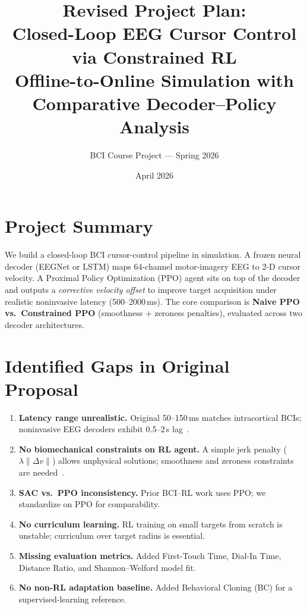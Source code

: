 \documentclass[11pt]{article}
\title{Revised Project Plan:\\Closed-Loop EEG Cursor Control via Constrained RL\\[0.3em]
\large Offline-to-Online Simulation with Comparative Decoder--Policy Analysis}
\author{BCI Course Project --- Spring 2026}
\date{April 2026}
\begin{document}
\maketitle

\section{Project Summary}
We build a closed-loop BCI cursor-control pipeline in simulation.
A frozen neural decoder (EEGNet or LSTM) maps 64-channel motor-imagery EEG to 2-D cursor velocity.
A Proximal Policy Optimization (PPO) agent sits on top of the decoder and outputs a \emph{corrective velocity offset} to improve target acquisition under realistic noninvasive latency (500--2000\,ms).
The core comparison is \textbf{Naive PPO vs.\ Constrained PPO} (smoothness + zeroness penalties), evaluated across two decoder architectures.

\section{Identified Gaps in Original Proposal}

\begin{enumerate}[leftmargin=*]
    \item \textbf{Latency range unrealistic.} Original 50--150\,ms matches intracortical BCIs; noninvasive EEG decoders exhibit 0.5--2\,s lag~\cite{korik2024}.
    \item \textbf{No biomechanical constraints on RL agent.} A simple jerk penalty ($\lambda\|\Delta v\|$) allows unphysical solutions; smoothness and zeroness constraints are needed~\cite{pitt2024}.
    \item \textbf{SAC vs.\ PPO inconsistency.} Prior BCI--RL work uses PPO; we standardize on PPO for comparability.
    \item \textbf{No curriculum learning.} RL training on small targets from scratch is unstable; curriculum over target radius is essential.
    \item \textbf{Missing evaluation metrics.} Added First-Touch Time, Dial-In Time, Distance Ratio, and Shannon--Welford model fit.
    \item \textbf{No non-RL adaptation baseline.} Added Behavioral Cloning (BC) for a supervised-learning reference.
\end{enumerate}
\end{document}
